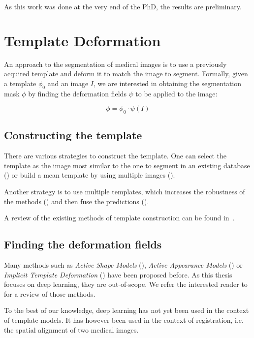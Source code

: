 As this work was done at the very end of the PhD, the results are preliminary.

\section{Template Deformation}
\label{sec:seg_biblio}

An approach to the segmentation of medical images is to use a previously acquired template and deform it to match the image to segment. Formally, given a template $\phi_0$ and an image $I$, we are interested in obtaining the segmentation mask $\phi$ by finding the deformation fields $\psi$ to be applied to the image:

\begin{equation}
    \phi = \phi_0 \cdot \psi \left( I \right)
\end{equation}

\subsection{Constructing the template}

There are various strategies to construct the template. One can select the template as the image most similar to the one to segment in an existing database (\textcite{commowick2007MICCAI}) or build a mean template by using multiple images (\textcite{joshi2004}).

Another strategy is to use multiple templates, which increases the robustness of the methods (\textcite{heckemann2006}) and then fuse the predictions (\textcite{warfield2004}). 

A review of the existing methods of template construction can be found in~\textcite{cabezas2011}.

\subsection{Finding the deformation fields}

Many methods such as \textit{Active Shape Models} (\textcite{cootes1995}), \textit{Active Appearance Models} (\textcite{cootes1998ECCV}) or \textit{Implicit Template Deformation} (\textcite{saddi2007}) have been proposed before. As this thesis focuses on deep learning, they are out-of-scope. We refer the interested reader to~\textcite{heimann2009} for a review of those methods.

To the best of our knowledge, deep learning has not yet been used in the context of template models. It has however been used in the context of registration, i.e. the spatial alignment of two medical images.

